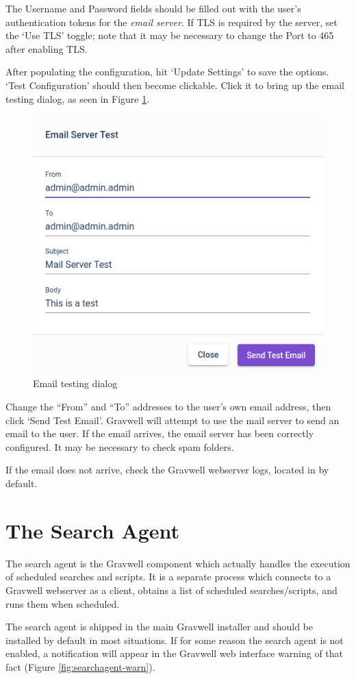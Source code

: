 The Username and Password fields should be filled out with the user's
authentication tokens for the \emph{email server}. If TLS is required by
the server, set the `Use TLS' toggle; note that it may be necessary to
change the Port to 465 after enabling TLS.

After populating the configuration, hit `Update Settings' to save the
options. `Test Configuration' should then become clickable. Click it to
bring up the email testing
dialog, as seen in Figure \ref{fig:email-testing}.

\begin{figure}
	\includegraphics[width=0.5\linewidth]{images/email-testing.png}
	\caption{Email testing dialog}
	\label{fig:email-testing}
\end{figure}

Change the ``From'' and ``To'' addresses to the user's own email
address, then click `Send Test Email'. Gravwell will attempt to use the
mail server to send an email to the user. If the email arrives, the
email server has been correctly configured. It may be necessary to check
spam folders.

If the email does not arrive, check the Gravwell webserver logs,
located in  by default.


\section{The Search Agent}

The search agent is the Gravwell component which actually handles the
execution of scheduled searches and scripts. It is a separate process
which connects to a Gravwell webserver as a client, obtains a list of
scheduled searches/scripts, and runs them when scheduled.

The search agent is shipped in the main Gravwell installer and should
be installed by default in most situations. If for some reason the
search agent is not enabled, a notification will appear in the Gravwell
web interface warning of that fact (Figure \ref{fig:searchagent-warn}).

